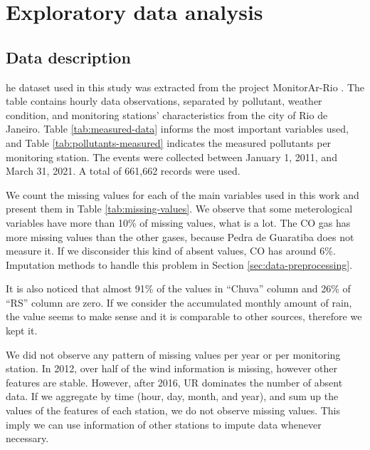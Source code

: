 \section{Exploratory data analysis}
\label{sec:eda}

\subsection{Data description}

he dataset used in this study was extracted from the project MonitorAr-Rio
\cite{dataset-rio-ar-quality}. The table contains hourly data observations, separated by
pollutant, weather condition, and monitoring stations' characteristics from
the city of Rio de Janeiro. Table
\ref{tab:measured-data} informs the most important variables used, and Table
\ref{tab:pollutants-measured} indicates the measured pollutants per monitoring
station. The events were collected between January 1,
2011,
and March 31, 2021. A total of 661,662 records were used.

We count the missing values for each of the main variables used in this work
and present them in Table \ref{tab:missing-values}. We observe that some
meterological variables have more than 10\% of missing values, what is a lot.
The CO gas has more missing values than the other gases, because Pedra de
Guaratiba does not measure it. If we disconsider this kind of absent values,
CO has around 6\%. Imputation methods to handle this problem in Section
\ref{sec:data-preprocessing}.

It is also noticed that almost 91\% of the values in ``Chuva'' column and 26\%
of ``RS'' column are zero. If we consider the accumulated monthly amount of
rain, the value seems to make sense and it is comparable to other sources,
therefore we kept it. 

We did not observe any pattern of missing values per year or per monitoring
station. In 2012, over half of the wind information is missing, however other
features are stable. However, after 2016, UR dominates the number of absent
data. If we aggregate by time (hour, day, month, and year), and sum up the
values of the features of each station, we do not observe missing values. This
imply we can use information of other stations to impute data whenever
necessary. 

